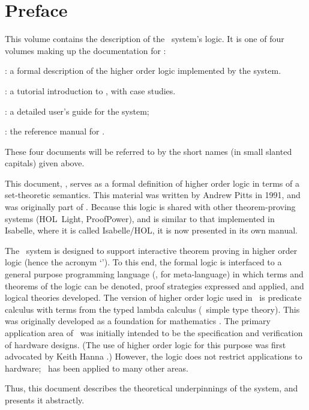 \chapter*{Preface}
\label{intro}

This volume contains the description of the \HOL\ system's logic.  It
is one of four volumes making up the documentation for \HOL:

\begin{myenumerate}
\item \LOGIC: a formal description of the higher order logic
  implemented by the \HOL{} system.
\item \TUTORIAL: a tutorial introduction to \HOL, with case studies.
\item \DESCRIPTION: a detailed user's guide for the \HOL{} system;
\item \REFERENCE: the reference manual for \HOL.
\end{myenumerate}

\noindent These four documents will be referred to by the short names (in
small slanted capitals) given above.

This document, \LOGIC, serves as a formal definition of higher order
logic in terms of a set-theoretic semantics.  This material was
written by Andrew Pitts in 1991, and was originally part of
\DESCRIPTION.  Because this logic is shared with other theorem-proving
systems (HOL~Light, ProofPower), and is similar to that implemented in
Isabelle, where it is called Isabelle/HOL, it is now presented in its
own manual.

The \HOL\ system is designed to support interactive theorem proving in
higher order logic (hence the acronym `\HOL').  To this end, the formal
logic is interfaced to a general purpose programming language (\ML, for
meta-language) in which terms and theorems of the logic can be denoted,
proof strategies expressed and applied, and logical theories developed.
The version of higher order logic used in \HOL\ is predicate calculus
with terms from the typed lambda calculus (\ie\ simple type
theory). This was originally developed as a foundation for mathematics
\cite{Church}.  The primary application area of \HOL\ was initially
intended to be the specification and verification of hardware designs.
(The use of higher order logic for this purpose was first advocated by
Keith Hanna \cite{Hanna-Daeche}.)  However, the logic does not restrict
applications to hardware; \HOL\ has been applied to many other areas.

Thus, this document describes the theoretical underpinnings of the
\HOL{} system, and presents it abstractly.

